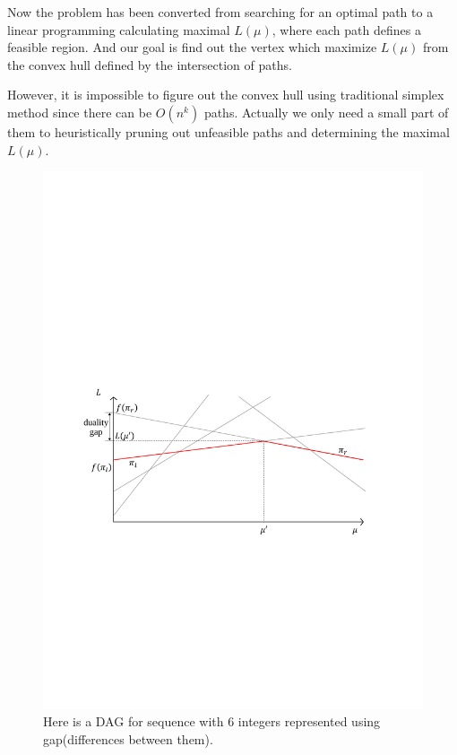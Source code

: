 \documentclass{sig-alternate-05-2015}
\begin{document}
Now the problem has been converted from searching for an optimal path to a linear programming calculating maximal $ L(\mu) $, where each path defines a feasible region.
And our goal is find out the vertex which maximize $ L(\mu) $ from the convex hull defined by the intersection of paths.

However, it is impossible to figure out the convex hull using traditional simplex method since there can be $ O(n^k) $ paths.
Actually we only need a small part of them to heuristically pruning out unfeasible paths and determining the maximal $ L(\mu) $.
\begin{figure}
	\centering
	\includegraphics[width=0.9\linewidth]{intersection}
	\caption[sssp]{Here is a DAG for sequence with 6 integers represented using gap(differences between them).
	{\color{red}{the horizontal line of LB and UB}}	}
	\label{fig: intersection}
\end{figure}
\end{document}
